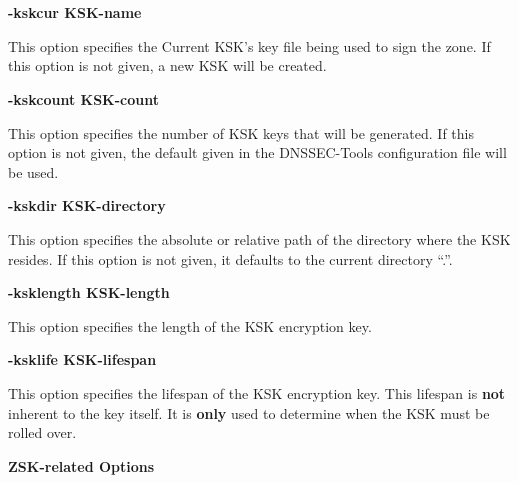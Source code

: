 \begin{description}

\item {\bf -kskcur KSK-name}\verb" "

This option specifies the Current KSK's key file being used to sign the zone.
If this option is not given, a new KSK will be created.

\item {\bf -kskcount KSK-count}\verb" "

This option specifies the number of KSK keys that will be generated.  If this
option is not given, the default given in the DNSSEC-Tools configuration file
will be used.

\item {\bf -kskdir KSK-directory}\verb" "

This option specifies the absolute or relative path of the directory
where the KSK resides.  If this option is not given, it defaults to
the current directory ``.''.

\item {\bf -ksklength KSK-length}\verb" "

This option specifies the length of the KSK encryption key.

\item {\bf -ksklife KSK-lifespan}\verb" "

This option specifies the lifespan of the KSK encryption key.  This lifespan
is {\bf not} inherent to the key itself.  It is {\bf only} used to determine
when the KSK must be rolled over.

\end{description}

{\bf ZSK-related Options}

